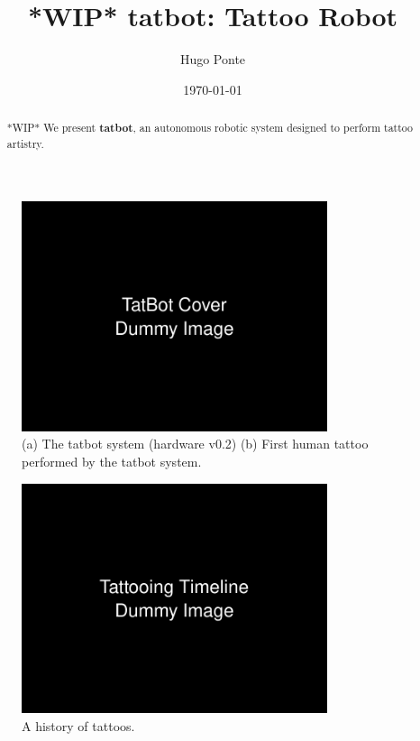 \documentclass[11pt]{article}
\title{ *WIP* tatbot: Tattoo Robot}
\author{Hugo Ponte}
\date{\today}
\begin{document}
\maketitle

\begin{figure}[h]
    \centering
    \includegraphics[width=0.8\textwidth]{figures/cover.png}
    \caption{(a) The tatbot system (hardware v0.2) (b) First human tattoo performed by the tatbot system. }
    \label{fig:cover}
\end{figure}


\begin{abstract}
*WIP* We present \textbf{tatbot}, an autonomous robotic system designed to perform tattoo artistry.
\end{abstract}

\pagebreak

\begin{figure}[h]
    \centering
    \includegraphics[width=0.8\textwidth]{figures/timeline.png}
    \caption{A history of tattoos.}
    \label{fig:timeline}
\end{figure}
\end{document}
